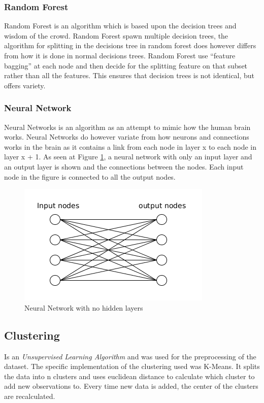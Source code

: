 \subsubsection{Random Forest}
Random Forest is an algorithm which is based upon the decision trees and wisdom of the crowd.
Random Forest spawn multiple decision trees, the algorithm for splitting in the decisions tree in random forest does however differs from how it is done in normal decisions trees.
Random Forest use ``feature bagging'' at each node and then decide for the splitting feature on that subset rather than all the features. This ensures that decision trees is not identical, but offers variety.

\subsubsection{Neural Network}
Neural Networks is an algorithm as an attempt to mimic how the human brain works.
Neural Networks do however variate from how neurons and connections works in the brain as it contains a link from each node in layer x to each node in layer x + 1. As seen at Figure \ref{fig:neuralnetwork}, a neural network with only an input layer and an output layer is shown and the connections between the nodes. Each input node in the figure is connected to all the output nodes.

\begin{figure}
  \centering
  \includegraphics[width=0.7\linewidth]{Images/neuralnetwork}
  \caption{Neural Network with no hidden layers}
  \label{fig:neuralnetwork}
\end{figure}

\subsection{Clustering}
Is an \emph{Unsupervised Learning Algorithm} and was used for the preprocessing of the dataset. The specific implementation of the clustering used was K-Means. It splits the data into n clusters and uses euclidean distance to calculate which cluster to add new observations to. Every time new data is added, the center of the clusters are recalculated.